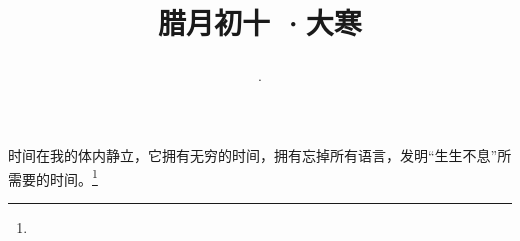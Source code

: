 \title{\date[d=20,m=1,y=2024][year:cn-y,年,month:cn,day:cn,日,·,weekday]·腊月初十 ·大寒}
时间在我的体内静立，它拥有无穷的时间，拥有忘掉所有语言，发明“生生不息”所需要的时间。\footnote{ }

